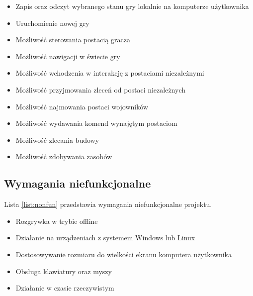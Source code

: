 \begin{itemize}\label{list:fun}
  \item Zapis oraz odczyt wybranego stanu gry lokalnie na komputerze użytkownika
  \item Uruchomienie nowej gry
  \item Możliwość sterowania postacią gracza
  \item Możliwość nawigacji w świecie gry
  \item Możliwość wchodzenia w interakcję z postaciami niezależnymi
  \item Możliwość przyjmowania zleceń od postaci niezależnych
  \item Możliwość najmowania postaci wojowników
  \item Możliwość wydawania komend wynajętym postaciom
  \item Możliwość zlecania budowy
  \item Możliwość zdobywania zasobów
\end{itemize}

\subsection{Wymagania niefunkcjonalne}\label{ss:nonfun}
Lista \ref{list:nonfun} przedstawia wymagania niefunkcjonalne projektu.

\begin{itemize}\label{list:nonfun}
  \item Rozgrywka w trybie offline
  \item Działanie na urządzeniach z systemem Windows lub Linux
  \item Dostosowywanie rozmiaru do wielkości ekranu komputera użytkownika
  \item Obsługa klawiatury oraz myszy
  \item Działanie w czasie rzeczywistym
\end{itemize}

